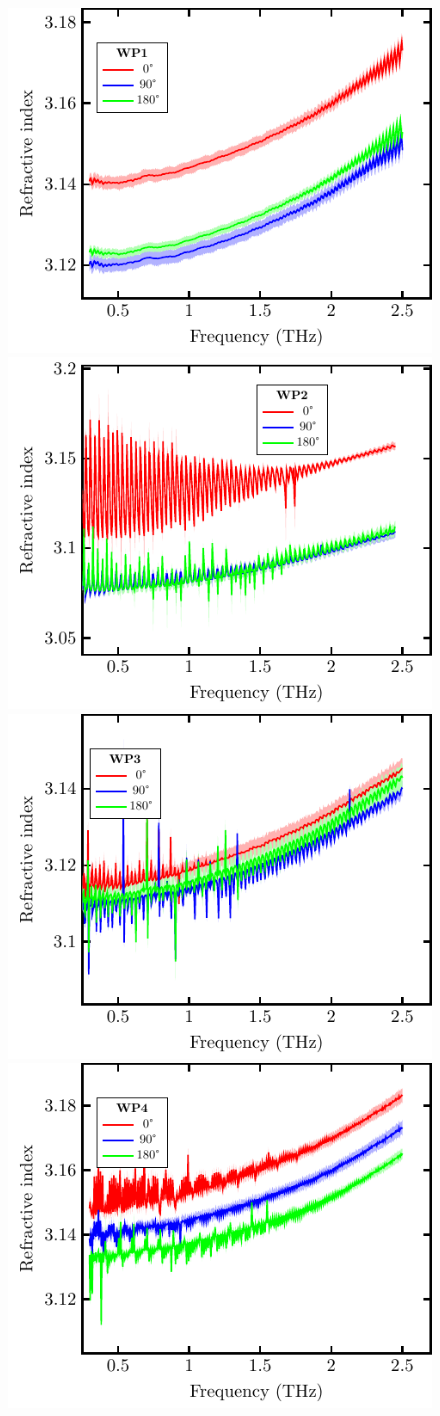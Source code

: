 \begin{figure}[H]
\centering
\subcaptionbox{\label{fig:ceramic_WP1}}
    {\hspace*{-2em}\includegraphics[width=0.45\linewidth]{images/7_appendix/plots/real/WP1.pdf}}
\qquad
\subcaptionbox{\label{fig:ceramic_WP2}}
    {\hspace*{-2em}\includegraphics[width=0.45\linewidth]{images/7_appendix/plots/real/WP2.pdf}}
\subcaptionbox{\label{fig:ceramic_WP3}}
    {\hspace*{-2em}\includegraphics[width=0.45\linewidth]{images/7_appendix/plots/real/WP3.pdf}}
\qquad
\subcaptionbox{\label{fig:ceramic_WP4}}
    {\hspace*{-2em}\includegraphics[width=0.45\linewidth]{images/7_appendix/plots/real/WP4.pdf}}

\end{figure}
